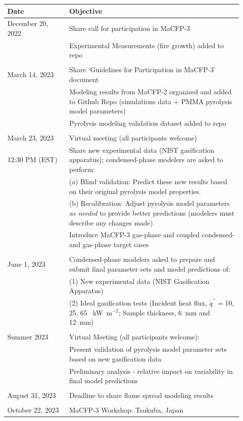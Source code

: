 \documentclass[12pt]{article}
\newcommand{\pp}{\prime\prime}
\begin{document}
\label{Timeline}
\begin{table}[h!]
\begin{tabular}{p{0.25\linewidth} | p{0.7\linewidth}}
\hline
\textbf{Date}          & \textbf{Objective} \\
\hline
December 20, 2022      & Share call for participation in MaCFP-3\\
                       & Experimental Measurements (fire growth) added to repo\\
\\
March 14, 2023          & Share `Guidelines for Participation in MaCFP-3' document \\
                       & Modeling results from MaCFP-2 organized and added to Github Repo (simulations data + PMMA pyrolysis model parameters)\\
                       & Pyrolysis modeling validation dataset added to repo\\
\\
March 23, 2023         & Virtual meeting (all participants welcome)\\
12:30 PM (EST)         & Share new experimental data (NIST gasification apparatus); condensed-phase modelers are asked to perform:\\
                       & (a) Blind validation: Predict these new results based on their original pyrolysis model properties. \\
                       & (b) Recalibration: Adjust pyrolysis model parameters \textit{as needed} to provide better predictions (modelers must describe any changes made)\\
                       & Introduce MaCFP-3 gas-phase and coupled condensed- and gas-phase target cases\\
\\
June 1, 2023           & Condensed-phase modelers asked to prepare and submit final parameter sets and model predictions of: \\
                       & (1) New experimental data (NIST Gasification Apparatus)\\
                       & (2) Ideal gasification tests (Incident heat flux, $\dot{q}^{\pp}=$10, 25, 65 ~kW~m$^{-2}$; Sample thickness, 6~mm and 12~mm)\\
\\
Summer 2023           & Virtual Meeting  (all participants welcome):\\
                       & Present validation of pyrolysis model parameter sets based on new gasification data \\
                       & Preliminary analysis - relative impact on variability in final model predictions\\
\\
August 31, 2023        & Deadline to share flame spread modeling results \\ {}\\
October 22, 2023       & MaCFP-3 Workshop: Tsukuba, Japan \\
\hline
\end{tabular}
\end{table}
\end{document}
